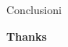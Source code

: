 \documentclass{beamer}
\begin{document}
	
		

	\begin{frame}{Conclusioni}
		\begin{center}
			{\Huge \textcolor{rossoPantano}{\textbf{Thanks}}}
		\end{center}
		
	\end{frame}
\end{document}
